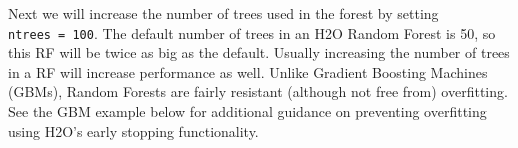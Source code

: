 \documentclass[]{book}
\newenvironment{Shaded}{\begin{snugshade}}{\end{snugshade}}
\newcommand{\DecValTok}[1]{\textcolor[rgb]{0.00,0.00,0.81}{#1}}
\newcommand{\ErrorTok}[1]{\textcolor[rgb]{0.64,0.00,0.00}{\textbf{#1}}}
\newcommand{\NormalTok}[1]{#1}
\newcommand{\OperatorTok}[1]{\textcolor[rgb]{0.81,0.36,0.00}{\textbf{#1}}}
\newcommand{\StringTok}[1]{\textcolor[rgb]{0.31,0.60,0.02}{#1}}
\begin{document}
\begin{Shaded}
\begin{Highlighting}[]
{{{{{{{  \OperatorTok{|}\StringTok{                                                                       }
\StringTok{  }\ErrorTok{|=======================================}\StringTok{                          }\ErrorTok{|}\StringTok{  }\DecValTok{60}\NormalTok{%}
  \OperatorTok{|}\StringTok{                                                                       }
\StringTok{  }\ErrorTok{|===============================================}\StringTok{                  }\ErrorTok{|}\StringTok{  }\DecValTok{72}\NormalTok{%}
  \OperatorTok{|}\StringTok{                                                                       }
\StringTok{  }\ErrorTok{|=======================================================}\StringTok{          }\ErrorTok{|}\StringTok{  }\DecValTok{84}\NormalTok{%}
  \OperatorTok{|}\StringTok{                                                                       }
\StringTok{  }\ErrorTok{|==============================================================}\StringTok{   }\ErrorTok{|}\StringTok{  }\DecValTok{96}\NormalTok{%}
  \OperatorTok{|}\StringTok{                                                                       }
\StringTok{  }\ErrorTok{|=================================================================|}\StringTok{ }\DecValTok{100}\NormalTok{%}
\end{Highlighting}
\end{Shaded}

Next we will increase the number of trees used in the forest by setting \texttt{ntrees\ =\ 100}.
The default number of trees in an H2O Random Forest is 50, so this RF will be twice as
big as the default. Usually increasing the number of trees in a RF will increase
performance as well. Unlike Gradient Boosting Machines (GBMs), Random Forests are fairly
resistant (although not free from) overfitting.
See the GBM example below for additional guidance on preventing overfitting using H2O's
early stopping functionality.
\end{document}

